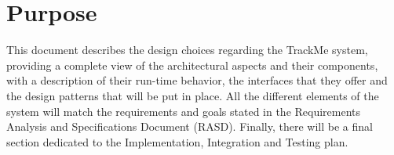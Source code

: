 \section{Purpose}
This document describes the design choices regarding the TrackMe system, providing a complete view of the architectural aspects and their components, with a description of their run-time behavior, the interfaces that they offer and the design patterns that will be put in place. All the different elements of the system will match the requirements and goals stated in the Requirements Analysis and Specifications Document (RASD). Finally, there will be a final section dedicated to the Implementation, Integration and Testing plan.